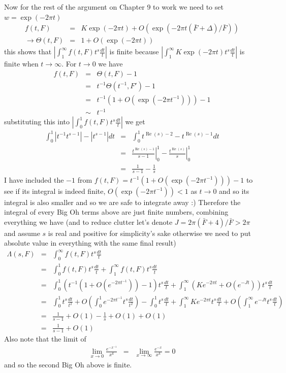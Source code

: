 \documentclass[aps,preprint,preprintnumbers,nofootinbib,showpacs,prd]{revtex4-1}
\newcommand{\nbea}{\begin{eqnarray*}}
\newcommand{\neea}{\end{eqnarray*}}
\DeclareMathOperator{\re}{Re}
\begin{document}
Now for the rest of the argument on Chapter 9 to work we need to set $w = \exp(-2\pi t)$
%
\nbea
f(t,F) & = & K\exp(-2\pi t) + O(\exp(-2\pi t(\bar F+\Delta)/\bar F)) \\
\to \Theta(t,F) & = & 1 + O(\exp(-2\pi t))
\neea
%
this shows that $\left|\int_1^\infty f(t,F)t^s \frac{dt}{t}\right|$ is finite because $\left|\int_1^\infty K\exp(-2\pi t) t^s \frac{dt}{t}\right|$ is finite when $t\to\infty$. For $t\to0$ we have
%
\nbea
f(t,F) & = & \Theta(t,F) - 1 \\
& = & t^{-1}\Theta(t^{-1},F') - 1 \\
& = & t^{-1}(1 + O(\exp(-2\pi t^{-1}))) - 1 \\
& \sim & t^{-1}
\neea
%
substituting this into $\left|\int_0^1 f(t,F)t^s \frac{dt}{t}\right|$ we get
%
\nbea
\int_0^1 \left|t^{-1}t^{s-1}\right| - \left|t^{s-1}\right|  dt & = & \int_0^1 t^{\re(s) - 2} - t^{\re(s) - 1} dt \\
& = & \left.\frac{t^{\re(s) - 1}}{s-1}\right|_0^1 -\left.\frac{t^{\re(s)}}{s}\right|_0^1 \\
& = & \frac{1}{s-1} - \frac{1}{s}
\neea
%
I have included the $-1$ from $f(t,F) = t^{-1}(1 + O(\exp(-2\pi t^{-1}))) - 1$ to see if its integral is indeed finite, $O(\exp(-2\pi t^{-1})) < 1$ as $t\to0$ and so its integral is also smaller and so we are safe to integrate away :) Therefore the integral of every Big Oh terms above are just finite numbers, combining everything we have (and to reduce clutter let's denote $J = 2\pi(\bar F+4)/\bar F > 2\pi$ and assume $s$ is real and positive for simplicity's sake otherwise we need to put absolute value in everything with the same final result)
%
\nbea
\Lambda(s,F) & = & \int_0^\infty f(t,F)t^s \frac{dt}{t} \\
& = & \int_0^1 f(t,F)t^s \frac{dt}{t} + \int_1^\infty f(t,F)t^s \frac{dt}{t} \\
& = & \int_0^1 \left(t^{-1}\left(1 + O\left(e^{-2\pi t^{-1}}\right)\right) - 1\right) t^s \frac{dt}{t} + \int_1^\infty \left (Ke^{-2\pi t} + O\left(e^{-J t}\right)\right)t^s \frac{dt}{t} \\
& = & \int_0^1 t^{s}\frac{dt}{t^2} +O\left(\int_0^1 e^{-2\pi t^{-1}}t^s\frac{dt}{t^2}\right) - \int_0^1 t^{s} \frac{dt}{t} + \int_1^\infty Ke^{-2\pi t}t^s \frac{dt}{t} + O\left(\int_1^\infty e^{-J t}t^s \frac{dt}{t}\right) \\
& = & \frac{1}{s-1} + O(1) - \frac{1}{s} + O(1) + O(1) \\
& = & \frac{1}{s-1} + O(1)
\neea
%
Also note that the limit of
%
\nbea
\lim_{x\to 0} \frac{e^{-x^{-1}}}{x^k} & = & \lim_{x\to\infty} \frac{e^{-x}}{x^k} = 0
\neea
%
and so the second Big Oh above is finite.
\end{document}
